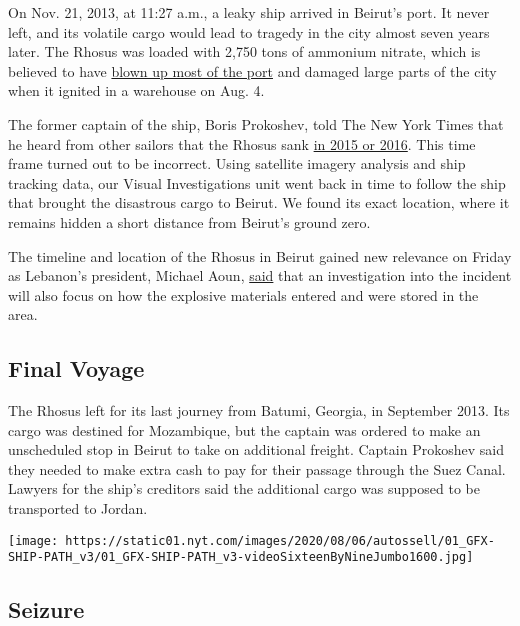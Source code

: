 On Nov. 21, 2013, at 11:27 a.m., a leaky ship arrived in Beirut's port.
It never left, and its volatile cargo would lead to tragedy in the city
almost seven years later. The Rhosus was loaded with 2,750 tons of
ammonium nitrate, which is believed to have
\href{https://www.nytimes.com/2020/08/05/video/beirut-explosion-footage.html}{blown
up most of the port} and damaged large parts of the city when it ignited
in a warehouse on Aug. 4.

The former captain of the ship, Boris Prokoshev, told The New York Times
that he heard from other sailors that the Rhosus sank
\href{https://www.nytimes.com/2020/08/05/world/middleeast/beirut-explosion-ship.html}{in
2015 or 2016}. This time frame turned out to be incorrect. Using
satellite imagery analysis and ship tracking data, our Visual
Investigations unit went back in time to follow the ship that brought
the disastrous cargo to Beirut. We found its exact location, where it
remains hidden a short distance from Beirut's ground zero.

The timeline and location of the Rhosus in Beirut gained new relevance
on Friday as Lebanon's president, Michael Aoun,
\href{https://www.nytimes.com/reuters/2020/08/07/world/middleeast/07reuters-lebanon-security-blast-president.html}{said}
that an investigation into the incident will also focus on how the
explosive materials entered and were stored in the area.

\hypertarget{final-voyage}{%
\subsection{Final Voyage}\label{final-voyage}}

The Rhosus left for its last journey from Batumi, Georgia, in September
2013. Its cargo was destined for Mozambique, but the captain was ordered
to make an unscheduled stop in Beirut to take on additional freight.
Captain Prokoshev said they needed to make extra cash to pay for their
passage through the Suez Canal. Lawyers for the ship's creditors said
the additional cargo was supposed to be transported to Jordan.

\texttt{[image: https://static01.nyt.com/images/2020/08/06/autossell/01\_GFX-SHIP-PATH\_v3/01\_GFX-SHIP-PATH\_v3-videoSixteenByNineJumbo1600.jpg]}

\hypertarget{seizure}{%
\subsection{Seizure}\label{seizure}}

